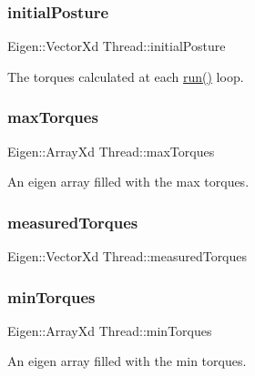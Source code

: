 \subsubsection{\texorpdfstring{initial\+Posture}{initialPosture}}
{\footnotesize\ttfamily Eigen\+::\+Vector\+Xd Thread\+::initial\+Posture\hspace{0.3cm}{\ttfamily [private]}}

The torques calculated at each \hyperlink{classThread_ad9373d8d725c46717dfce3130018fe3a}{run()} loop. \hypertarget{classThread_af28a4fcbbcbf77c42237c0be75a25a54}{}\label{classThread_af28a4fcbbcbf77c42237c0be75a25a54} 
\subsubsection{\texorpdfstring{max\+Torques}{maxTorques}}
{\footnotesize\ttfamily Eigen\+::\+Array\+Xd Thread\+::max\+Torques\hspace{0.3cm}{\ttfamily [private]}}

An eigen array filled with the max torques. \hypertarget{classThread_aa9cbe8744e51571a17fa726d8d16a0c6}{}\label{classThread_aa9cbe8744e51571a17fa726d8d16a0c6} 
\subsubsection{\texorpdfstring{measured\+Torques}{measuredTorques}}
{\footnotesize\ttfamily Eigen\+::\+Vector\+Xd Thread\+::measured\+Torques\hspace{0.3cm}{\ttfamily [private]}}

\hypertarget{classThread_a414015415c64371877d6028417c4f9e2}{}\label{classThread_a414015415c64371877d6028417c4f9e2} 
\subsubsection{\texorpdfstring{min\+Torques}{minTorques}}
{\footnotesize\ttfamily Eigen\+::\+Array\+Xd Thread\+::min\+Torques\hspace{0.3cm}{\ttfamily [private]}}

An eigen array filled with the min torques. \hypertarget{classThread_a1dcef9aedc1a707e6f04d5fb6e4a0b13}{}\label{classThread_a1dcef9aedc1a707e6f04d5fb6e4a0b13} 
